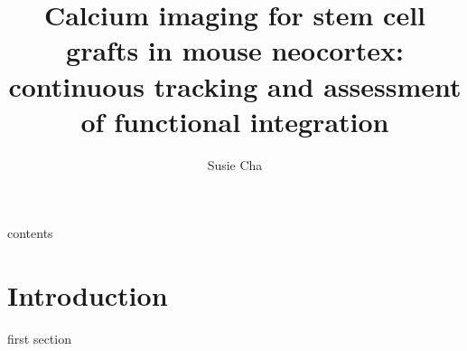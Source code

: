 \title{Calcium imaging for stem cell grafts in mouse neocortex: continuous tracking and assessment of functional integration}
\author{Susie Cha}



\maketitle

\tableof contents

\section{Introduction}

first section

